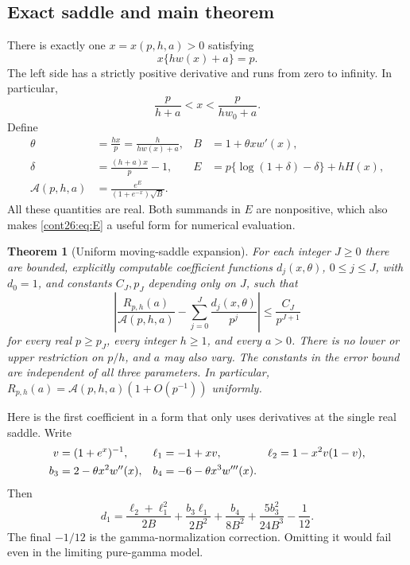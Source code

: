 \documentclass[11pt,letterpaper]{article}
\numberwithin{equation}{section}
\theoremstyle{plain}
\newtheorem{theorem}{Theorem}[section]
\theoremstyle{definition}
\theoremstyle{remark}
\begin{document}
\subsection{Exact saddle and main theorem}
There is exactly one $x=x(p,h,a)>0$ satisfying
\begin{equation}\label{cont26:eq:saddle}
 x\{h w(x)+a\}=p.
\end{equation}
The left side has a strictly positive derivative and runs from zero
to infinity. In particular,
\begin{equation}\label{cont26:eq:x-bracket}
 \frac{p}{h+a}<x<\frac{p}{h w_0+a}.
\end{equation}
Define
\begin{align}
 \theta&=\frac{hx}{p}=\frac{h}{h w(x)+a},&
 B&=1+\theta xw'(x),\label{cont26:eq:thetaB}\\
 \delta&=\frac{(h+a)x}{p}-1,&
 E&=p\{\log(1+\delta)-\delta\}+hH(x),\label{cont26:eq:E}\\
 \mathcal A(p,h,a)&=\frac{e^E}{(1+e^{-x})\sqrt B}.
 \label{cont26:eq:Auniform}
\end{align}
All these quantities are real. Both summands in $E$ are nonpositive,
which also makes \eqref{cont26:eq:E} a useful form for numerical evaluation.

\begin{theorem}[Uniform moving-saddle expansion]\label{cont26:thm:uniform}
For each integer $J\geq0$ there are bounded, explicitly computable
coefficient functions $d_j(x,\theta)$, $0\leq j\leq J$, with $d_0=1$,
and constants $C_J,p_J$ depending only on $J$, such that
\begin{equation}\label{cont26:eq:uniform-all}
 \left|\frac{R_{p,h}(a)}{\mathcal A(p,h,a)}
       -\sum_{j=0}^J\frac{d_j(x,\theta)}{p^j}\right|
 \leq \frac{C_J}{p^{J+1}}
\end{equation}
for every real $p\geq p_J$, every integer $h\geq1$, and every $a>0$.
There is no lower or upper restriction on $p/h$, and $a$ may also vary.
The constants in the error bound are independent of all three parameters.
In particular, $R_{p,h}(a)=\mathcal A(p,h,a)(1+O(p^{-1}))$ uniformly.
\end{theorem}

Here is the first coefficient in a form that only uses derivatives at the
single real saddle. Write
\begin{align}
 v&=(1+e^x)^{-1},&
 \ell_1&=-1+xv,&\ell_2&=1-x^2v(1-v),\notag\\
 b_3&=2-\theta x^2w''(x),&
 b_4&=-6-\theta x^3w'''(x).\label{cont26:eq:first-data}
\end{align}
Then
\begin{equation}\label{cont26:eq:d1}
 d_1=\frac{\ell_2+\ell_1^2}{2B}
     +\frac{b_3\ell_1}{2B^2}
     +\frac{b_4}{8B^2}
     +\frac{5b_3^2}{24B^3}-\frac1{12}.
\end{equation}
The final $-1/12$ is the gamma-normalization correction. Omitting it
would fail even in the limiting pure-gamma model.
\end{document}
